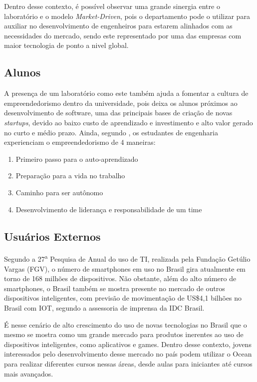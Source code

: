 Dentro desse contexto, é possível observar uma grande sinergia entre o laboratório e o modelo \textit{Market-Driven}, pois o departamento pode o utilizar para auxiliar no desenvolvimento de engenheiros para estarem alinhados com as necessidades do mercado, sendo este representado por uma das empresas com maior tecnologia de ponto a nivel global.

\subsection{Alunos}
\label{sec:con_alunos}

A presença de um laboratório como este também ajuda a fomentar a cultura de empreendedorismo dentro da universidade, pois deixa os alunos próximos ao desenvolvimento de software, uma das principais bases de criação de novas \textit{startups}, devido ao baixo custo de aprendizado e investimento e alto valor gerado no curto e médio prazo. Ainda, segundo , os estudantes de engenharia experienciam o empreendedorismo de 4 maneiras: 

\begin{enumerate}
\item Primeiro passo para o auto-aprendizado
\item Preparação para a vida no trabalho
\item Caminho para ser autônomo
\item Desenvolvimento de liderança e responsabilidade de um time
\end{enumerate}

\subsection{Usuários Externos}
\label{sec:con_usuarios}

Segundo a 27\textsuperscript{a} Pesquisa de Anual do uso de TI, realizada pela Fundação Getúlio Vargas (FGV), o número de smartphones em uso no Brasil gira atualmente em torno de 168 milhões de dispositivos. \cite{tifgv} Não obstante, além do alto número de smartphones, o Brasil também se mostra presente no mercado de outros dispositivos inteligentes, com previsão de movimentação de US\$4,1 bilhões no Brasil com IOT, segundo a assessoria de imprensa da IDC Brasil. \cite{idc}

É nesse cenário de alto crescimento do uso de novas tecnologias no Brasil que o mesmo se mostra como um grande mercado para produtos inerentes ao uso de dispositivos inteligentes, como aplicativos e games. Dentro desse contexto, jovens interessados pelo desenvolvimento desse mercado no país podem utilizar o Ocean para realizar diferentes cursos nessas áreas, desde aulas para iniciantes até cursos mais avançados.

